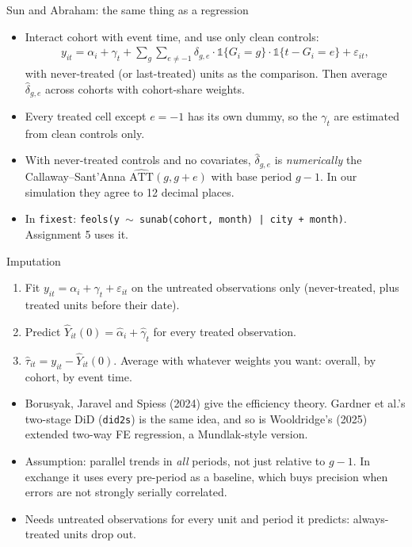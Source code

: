 \documentclass[aspectratio=169,11pt]{beamer}
\begin{document}
\begin{frame}{Sun and Abraham: the same thing as a regression}
\begin{itemize}
	\item Interact cohort with event time, and use only clean controls:
	\begin{align*}
		y_{it} = \alpha_i + \gamma_t + \sum_{g} \sum_{e \neq -1} \delta_{g,e} \cdot \mathbb{1}\{G_i = g\} \cdot \mathbb{1}\{t - G_i = e\} + \varepsilon_{it},
	\end{align*}
	with never-treated (or last-treated) units as the comparison. Then average $\hat\delta_{g,e}$ across cohorts with
	cohort-share weights.
	\medskip
	\item Every treated cell except $e = -1$ has its own dummy, so the $\gamma_t$ are estimated from clean controls only.
	\medskip
	\item With never-treated controls and no covariates, $\hat\delta_{g,e}$ is \emph{numerically} the Callaway--Sant'Anna
	$\widehat{\text{ATT}}(g, g+e)$ with base period $g-1$. In our simulation they agree to 12 decimal places.
	\medskip
	\item In \texttt{fixest}: \texttt{feols(y $\sim$ sunab(cohort, month) | city + month)}. Assignment 5 uses it.
\end{itemize}
\end{frame}


\begin{frame}{Imputation}
\begin{enumerate}
	\item Fit $y_{it} = \alpha_i + \gamma_t + \varepsilon_{it}$ on the \alert{untreated} observations only (never-treated, plus
	treated units before their date).
	\item Predict $\hat Y_{it}(0) = \hat\alpha_i + \hat\gamma_t$ for every treated observation.
	\item $\hat\tau_{it} = y_{it} - \hat Y_{it}(0)$. Average with whatever weights you want: overall, by cohort, by event time.
\end{enumerate}
\medskip
\begin{itemize}
	\item Borusyak, Jaravel and Spiess (2024) give the efficiency theory. Gardner et al.'s two-stage DiD (\texttt{did2s}) is the
	same idea, and so is Wooldridge's (2025) extended two-way FE regression, a Mundlak-style version.
	\medskip
	\item Assumption: parallel trends in \emph{all} periods, not just relative to $g-1$. In exchange it uses every pre-period as a
	baseline, which buys precision when errors are not strongly serially correlated.
	\medskip
	\item Needs untreated observations for every unit and period it predicts: always-treated units drop out.
\end{itemize}
\end{frame}
\end{document}
